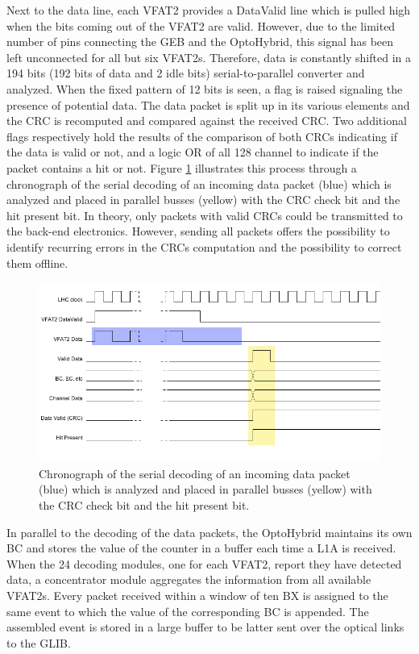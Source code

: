       Next to the data line, each VFAT2 provides a DataValid line which is pulled high when the bits coming out of the VFAT2 are valid. However, due to the limited number of pins connecting the GEB and the OptoHybrid, this signal has been left unconnected for all but six VFAT2s. Therefore, data is constantly shifted in a 194 bits (192 bits of data and 2 idle bits) serial-to-parallel converter and analyzed. When the fixed pattern of 12 bits is seen, a flag is raised signaling the presence of potential data. The data packet is split up in its various elements and the CRC is recomputed and compared against the received CRC. Two additional flags respectively hold the results of the comparison of both CRCs indicating if the data is valid or not, and a logic OR of all 128 channel to indicate if the packet contains a hit or not. Figure \ref{fig:II-3-tkdata-chrono} illustrates this process through a chronograph of the serial decoding of an incoming data packet (blue) which is analyzed and placed in parallel busses (yellow) with the CRC check bit and the hit present bit. In theory, only packets with valid CRCs could be transmitted to the back-end electronics. However, sending all packets offers the possibility to identify recurring errors in the CRCs computation and the possibility to correct them offline. \\

      \begin{figure}[h!]
        \centering
        \includegraphics[width=\textwidth]{img/II-3-test-beam/tkdata-chrono.png}
        \caption{Chronograph of the serial decoding of an incoming data packet (blue) which is analyzed and placed in parallel busses (yellow) with the CRC check bit and the hit present bit.}
        \label{fig:II-3-tkdata-chrono}
      \end{figure}

      In parallel to the decoding of the data packets, the OptoHybrid maintains its own BC and stores the value of the counter in a buffer each time a L1A is received. When the 24 decoding modules, one for each VFAT2, report they have detected data, a concentrator module aggregates the information from all available VFAT2s. Every packet received within a window of ten BX is assigned to the same event to which the value of the corresponding BC is appended. The assembled event is stored in a large buffer to be latter sent over the optical links to the GLIB. \\

